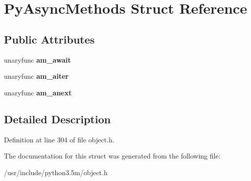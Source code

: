 \hypertarget{structPyAsyncMethods}{}\section{Py\+Async\+Methods Struct Reference}
\label{structPyAsyncMethods}
\subsection*{Public Attributes}
\begin{DoxyCompactItemize}
\item 
unaryfunc {\bfseries am\+\_\+await}\hypertarget{structPyAsyncMethods_ac4e09288978c8ed28d452bfc501a4fab}{}\label{structPyAsyncMethods_ac4e09288978c8ed28d452bfc501a4fab}

\item 
unaryfunc {\bfseries am\+\_\+aiter}\hypertarget{structPyAsyncMethods_acde88d570e847b03c88c12667dbe20bc}{}\label{structPyAsyncMethods_acde88d570e847b03c88c12667dbe20bc}

\item 
unaryfunc {\bfseries am\+\_\+anext}\hypertarget{structPyAsyncMethods_a12e3ca0db5e75acbc2781b360b64d269}{}\label{structPyAsyncMethods_a12e3ca0db5e75acbc2781b360b64d269}

\end{DoxyCompactItemize}


\subsection{Detailed Description}


Definition at line 304 of file object.\+h.



The documentation for this struct was generated from the following file\+:\begin{DoxyCompactItemize}
\item 
/usr/include/python3.\+5m/object.\+h\end{DoxyCompactItemize}
